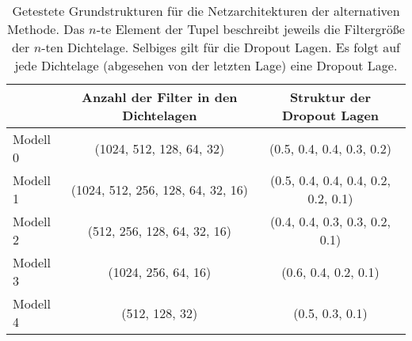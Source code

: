 \begin{table}
  \centering%
  \begin{tabular}{l
                  c
                  c}
      \toprule
      {}    & Anzahl der Filter in den Dichtelagen  & Struktur der Dropout Lagen      \\
      \midrule
      Modell 0    & (1024, 512, 128, 64, 32)  & (0.5, 0.4, 0.4, 0.3, 0.2) \\
      Modell 1    & (1024, 512, 256, 128, 64, 32, 16)  & (0.5, 0.4, 0.4, 0.4, 0.2, 0.2, 0.1) \\
      Modell 2    & (512, 256, 128, 64, 32, 16)  & (0.4, 0.4, 0.3, 0.3, 0.2, 0.1) \\
      Modell 3    & (1024, 256, 64, 16)  & (0.6, 0.4, 0.2, 0.1) \\
      Modell 4    & (512, 128, 32)  & (0.5, 0.3, 0.1) \\
      \bottomrule
  \end{tabular}
  \caption{Getestete Grundstrukturen für die Netzarchitekturen der alternativen Methode. Das $n$-te Element der Tupel beschreibt jeweils die Filtergröße der $n$-ten Dichtelage. Selbiges gilt für die Dropout Lagen. Es folgt auf jede Dichtelage (abgesehen von der letzten Lage) eine Dropout Lage.}
  \label{tab:grid}
\end{table}
%
